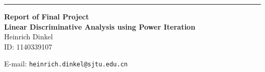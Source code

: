 \documentclass{article}
\begin{document}
\begin{CJK}{UTF8}{gbsn}


\hrule

\vspace{0.4in}
\begin{center}
{\bf Report of Final Project \\ \bf Linear Discriminative Analysis using Power Iteration\\}
\bigskip
Heinrich Dinkel\\
ID: 1140339107\\
\smallskip
\date
\bigskip

E-mail: {\tt heinrich.dinkel@sjtu.edu.cn}\\

\end{center}

\newcommand{\ppath}{.}



\newpage
\end{CJK}
\end{document}
